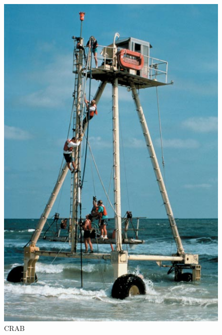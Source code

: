 \documentclass[7pt]{beamer}
\begin{document}
\begin{frame}
\begin{columns}
            \begin{figure}[h]
                \includegraphics[width=0.8\linewidth]{img/CRAB3.JPG}
                \captionsetup{labelformat=empty}
                \caption{CRAB}
            \end{figure}
    
    \end{columns}
\end{frame}
\end{document}
